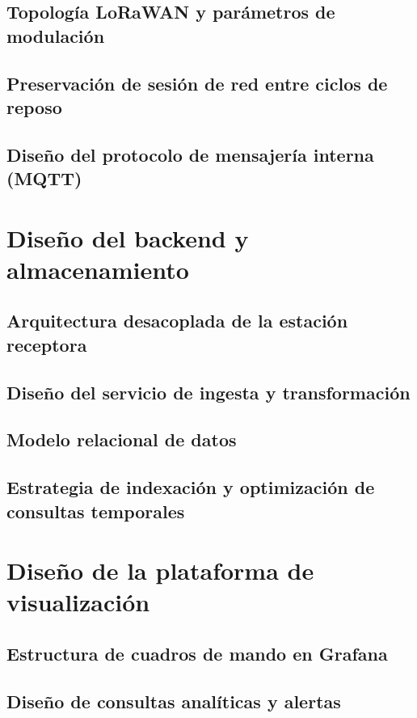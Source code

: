 \subsection{Topología LoRaWAN y parámetros de modulación}
\subsection{Preservación de sesión de red entre ciclos de reposo}
\subsection{Diseño del protocolo de mensajería interna (MQTT)}

\section{Diseño del backend y almacenamiento}
\subsection{Arquitectura desacoplada de la estación receptora}
\subsection{Diseño del servicio de ingesta y transformación}
\subsection{Modelo relacional de datos}
\subsection{Estrategia de indexación y optimización de consultas temporales}

\section{Diseño de la plataforma de visualización}
\subsection{Estructura de cuadros de mando en Grafana}
\subsection{Diseño de consultas analíticas y alertas}

